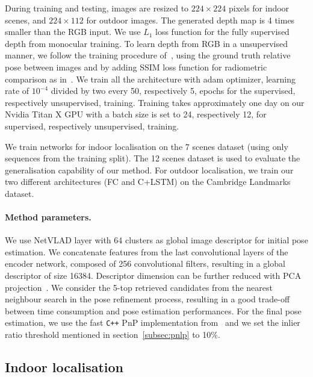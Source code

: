During training and testing, images are resized to $224 \times 224$ pixels for indoor scenes, and $224 \times 112$ for outdoor images. The generated depth map is 4 times smaller than the RGB input. We use $L_1$ loss function for the fully supervised depth from monocular training. To learn depth from RGB in a unsupervised manner, we follow the training procedure of~\citep{Zhou2017a}, using the ground truth relative pose between images and by adding SSIM loss function for radiometric comparison as in~\citep{Mahjourian2018}. We train all the architecture with adam optimizer, learning rate of $10^{-4}$ divided by two every 50, respectively 5, epochs for the supervised, respectively unsupervised, training. Training takes approximately one day on our Nvidia Titan X GPU with a batch size is set to 24, respectively 12, for supervised, respectively unsupervised, training.

We train networks for indoor localisation on the 7 scenes dataset (using only sequences from the training split). The 12 scenes dataset is used to evaluate the generalisation capability of our method. For outdoor localisation, we train our two different architectures (FC and C+LSTM) on the Cambridge Landmarks dataset.

\paragraph{Method parameters.} We use NetVLAD layer with 64 clusters as global image descriptor for initial pose estimation. We concatenate features from the last convolutional layers of the encoder network, composed of 256 convolutional filters, resulting in a global descriptor of size 16384. Descriptor dimension can be further reduced with PCA projection~\citep{Arandjelovic2017}. We consider the 5-top retrieved candidates from the nearest neighbour search in the pose refinement process, resulting in a good trade-off between time consumption and pose estimation performances. For the final pose estimation, we use the fast \texttt{C++} PnP implementation from~\citep{Kneip2014opengv} and we set the inlier ratio threshold mentioned in section~\ref{subsec:pnlp} to 10\%.

\subsection{Indoor localisation}
\label{subseq:indoor}

